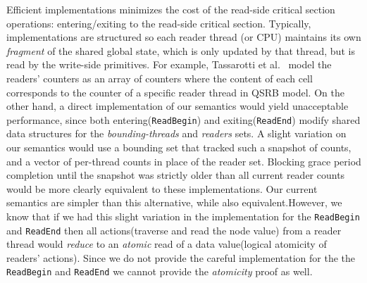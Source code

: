  Efficient implementations minimizes the cost of the read-side critical section operations: entering/exiting to the read-side critical section. Typically, implementations are structured so each reader thread (or CPU) maintains its own \emph{fragment} of the shared global state, which is only updated by that thread, but is read by the write-side primitives. For example, Tassarotti et al.~\cite{verrcu} model the readers' counters as an array of counters where the content of each cell corresponds to the counter of a specific reader thread in QSRB model. On the other hand, a direct implementation of our semantics would yield unacceptable performance, since both entering(\lstinline|ReadBegin|) and exiting(\lstinline|ReadEnd|) modify shared data structures for the \textit{bounding-threads} and \textit{readers} sets. A slight variation on our semantics would use a bounding set  that tracked such a snapshot of counts, and a vector of per-thread counts in place of the reader set. Blocking grace period completion until the snapshot was strictly older than all current reader counts would be more clearly equivalent to these implementations. Our current semantics are simpler than this alternative, while also equivalent.However, we know that if we had this slight variation in the implementation for the \lstinline|ReadBegin| and \lstinline|ReadEnd| then all actions(traverse and read the node value) from a reader thread would \textit{reduce} to an \textit{atomic} read of a data value(logical atomicity of readers' actions). Since we do not provide the careful implementation for the the \lstinline|ReadBegin| and \lstinline|ReadEnd| we cannot provide the \textit{atomicity} proof as well.

